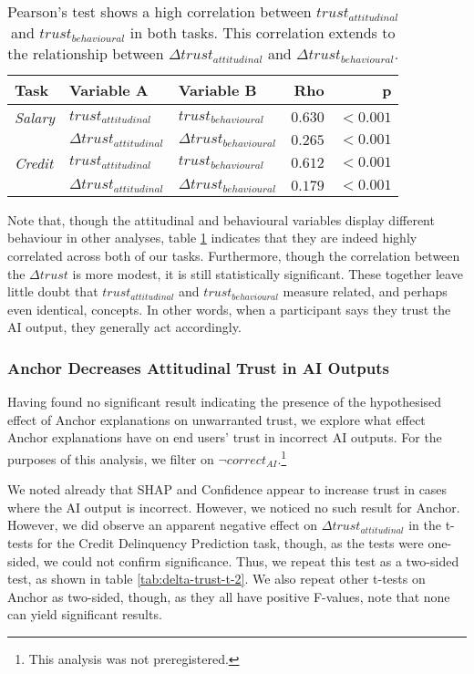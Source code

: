 \begin{table}[htb]
    \centering
    \caption{Pearson's test shows a high correlation between $trust_{attitudinal}$ and $trust_{behavioural}$ in both tasks. This correlation extends to the relationship between $\Delta trust_{attitudinal}$ and $\Delta trust_{behavioural}$.}
    \label{tab:trust-correlation}
    \begin{tabular}{lllrr}
        \toprule
        Task & Variable A & Variable B & Rho & p \\
        \midrule
        \emph{Salary} & $trust_{attitudinal}$ & $trust_{behavioural}$ & $\mathbf{0.630}$ & $\mathbf{<0.001}$ \\
        & $\Delta trust_{attitudinal}$ & $\Delta trust_{behavioural}$ & $\mathbf{0.265}$ & $\mathbf{<0.001}$ \\
        \midrule
        \emph{Credit} & $trust_{attitudinal}$ & $trust_{behavioural}$ & $\mathbf{0.612}$ & $\mathbf{<0.001}$ \\
        & $\Delta trust_{attitudinal}$ & $\Delta trust_{behavioural}$ & $\mathbf{0.179}$ & $\mathbf{<0.001}$ \\
        \bottomrule
    \end{tabular}
\end{table}

Note that, though the attitudinal and behavioural variables display different behaviour in other analyses, table \ref{tab:trust-correlation} indicates that they are indeed highly correlated across both of our tasks. Furthermore, though the correlation between the $\Delta trust$ is more modest, it is still statistically significant. These together leave little doubt that $trust_{attitudinal}$ and $trust_{behavioural}$ measure related, and perhaps even identical, concepts. In other words, when a participant says they trust the AI output, they generally act accordingly.

\subsubsection{Anchor Decreases Attitudinal Trust in AI Outputs}\label{sec:anchor-attitudinal}
Having found no significant result indicating the presence of the hypothesised effect of Anchor explanations on unwarranted trust, we explore what effect Anchor explanations have on end users' trust in incorrect AI outputs. For the purposes of this analysis, we filter on $\neg correct_{AI}$.\footnote{This analysis was not preregistered.}

We noted already that SHAP and Confidence appear to increase trust in cases where the AI output is incorrect. However, we noticed no such result for Anchor. However, we did observe an apparent negative effect on $\Delta trust_{attitudinal}$ in the t-tests for the Credit Delinquency Prediction task, though, as the tests were one-sided, we could not confirm significance. Thus, we repeat this test as a two-sided test, as shown in table \ref{tab:delta-trust-t-2}. We also repeat other t-tests on Anchor as two-sided, though, as they all have positive F-values, note that none can yield significant results.

